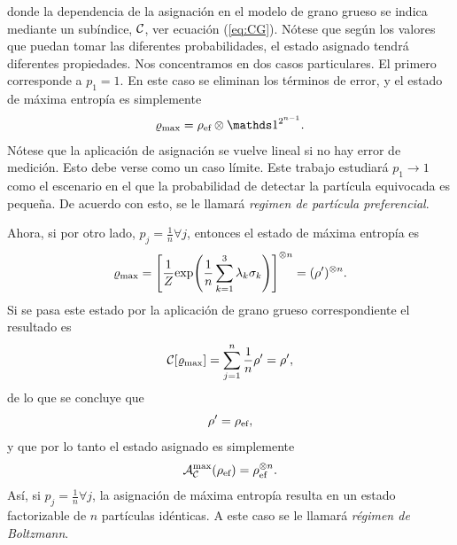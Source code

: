 

donde la dependencia de la asignación en el modelo de grano grueso se indica mediante un subíndice, $\mathcal{C}$, ver ecuación (\ref{eq:CG}). Nótese que según los valores que puedan tomar las diferentes probabilidades, el estado asignado tendrá diferentes propiedades. Nos concentramos en dos casos particulares. El primero corresponde a $p_{1}=1$. En este caso se eliminan los términos de error, y el estado de máxima entropía es simplemente
\begin{equation}
    \varrho_{\max}=\rho_{\ef}\otimes\Id^{2^{n-1}}.\nonumber
\end{equation}
Nótese que la aplicación de asignación se vuelve lineal si no hay error de medición. Esto debe verse como un caso límite. Este trabajo estudiará $p_{1}\rightarrow 1$ como el escenario en el que la probabilidad de detectar la partícula equivocada es pequeña. De acuerdo con esto, se le llamará  \textit{regimen de partícula preferencial}.

Ahora, si por otro lado, $p_{j}=\frac{1}{n}\forall j$, entonces el estado de máxima entropía es
\begin{equation}
    \varrho_{\max}=\qty[\frac{1}{Z}\text{exp}\qty(\frac{1}{n}\sum_{k=1}^{3}\lambda_{k}\sigma_{k})]^{\otimes n}=(\rho')^{\otimes n}.\nonumber
\end{equation}
Si se pasa este estado por la aplicación de grano grueso correspondiente el resultado es 
\begin{equation}
    \mathcal{C}[\varrho_{\max}]=\sum_{j=1}^{n}\frac{1}{n}\rho'=\rho',\nonumber
\end{equation}
de  lo que se concluye que
\begin{equation*}
    \rho'=\rho_{\text{ef}},
\end{equation*}
y que por lo tanto el estado asignado es simplemente
\begin{equation}
    \mathcal{A}_{\mathcal{C}}^{\max}(\rho_{\text{ef}})=\rho_{\text{ef}}^{\otimes n}.\nonumber
\end{equation}
Así, si $p_{j}=\frac{1}{n}\forall j$, la asignación de máxima entropía resulta en un estado factorizable de $n$ partículas idénticas. A este caso se le llamará \textit{régimen de Boltzmann}.




